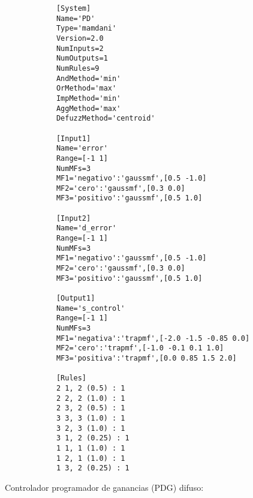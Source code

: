     \begin{longlisting}				
        \begin{verbatim}
            [System]
            Name='PD'
            Type='mamdani'
            Version=2.0
            NumInputs=2
            NumOutputs=1
            NumRules=9
            AndMethod='min'
            OrMethod='max'
            ImpMethod='min'
            AggMethod='max'
            DefuzzMethod='centroid'

            [Input1]
            Name='error'
            Range=[-1 1]
            NumMFs=3
            MF1='negativo':'gaussmf',[0.5 -1.0]
            MF2='cero':'gaussmf',[0.3 0.0]
            MF3='positivo':'gaussmf',[0.5 1.0]

            [Input2]
            Name='d_error'
            Range=[-1 1]
            NumMFs=3
            MF1='negativo':'gaussmf',[0.5 -1.0]
            MF2='cero':'gaussmf',[0.3 0.0]
            MF3='positivo':'gaussmf',[0.5 1.0]

            [Output1]
            Name='s_control'
            Range=[-1 1]
            NumMFs=3
            MF1='negativa':'trapmf',[-2.0 -1.5 -0.85 0.0]
            MF2='cero':'trapmf',[-1.0 -0.1 0.1 1.0]
            MF3='positiva':'trapmf',[0.0 0.85 1.5 2.0]

            [Rules]
            2 1, 2 (0.5) : 1
            2 2, 2 (1.0) : 1
            2 3, 2 (0.5) : 1
            3 3, 3 (1.0) : 1
            3 2, 3 (1.0) : 1
            3 1, 2 (0.25) : 1
            1 1, 1 (1.0) : 1
            1 2, 1 (1.0) : 1
            1 3, 2 (0.25) : 1
        \end{verbatim}
    \end{longlisting}

    Controlador programador de ganancias (PDG) difuso:

